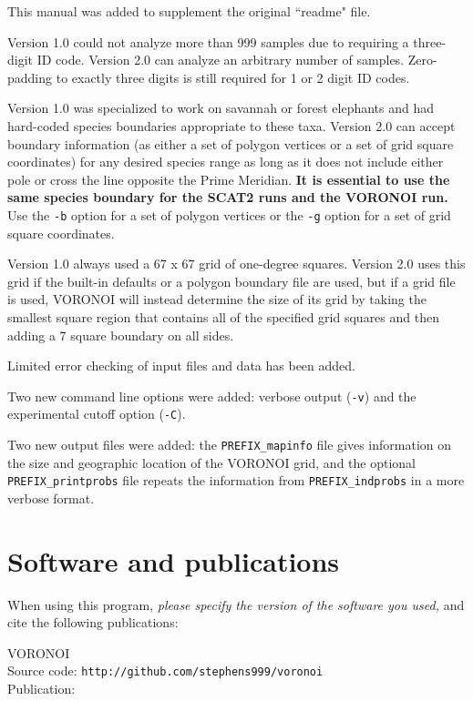 \documentclass[10pt,titlepage,times,letterpaper]{article}
\begin{document}
This manual was added to supplement the original ``readme" file.

Version 1.0 could not analyze more than 999 samples due to requiring a three-digit
ID code.  Version 2.0 can analyze an arbitrary number of samples.  Zero-padding 
to exactly three digits is still required for 1 or 2 digit ID codes.

Version 1.0 was specialized to work on savannah or forest elephants and had hard-coded
species boundaries appropriate to these taxa.  Version 2.0 can accept boundary information
(as either a set of polygon vertices or a set of grid square coordinates) for
any desired species range as long as it does not include either pole or cross the line
opposite the Prime Meridian.
{\bf It is essential to use the same species boundary for the SCAT2 runs and the VORONOI run.}
Use the {\tt -b} option for a set of polygon vertices or the {\tt -g} option for
a set of grid square coordinates.

Version 1.0 always used a 67 x 67 grid of one-degree squares.  Version 2.0 uses this
grid if the built-in defaults or a polygon boundary file are used, but if a grid file is used,
VORONOI will instead determine the size of its grid by taking the smallest square region 
that contains all of the specified grid squares and then adding a 7 square boundary on all sides.

Limited error checking of input files and data has been added.

Two new command line options were added:  verbose output ({\tt -v}) and the experimental cutoff 
option ({\tt -C}).

Two new output files were added:  the {\tt PREFIX\_mapinfo} file gives information on the
size and geographic location of the VORONOI grid, and the optional {\tt PREFIX\_printprobs}
file repeats the information from {\tt PREFIX\_indprobs} in a more verbose format.


\section{Software and publications}\label{software}

When using this program, {\it please specify the version of the software you used,} and
cite the following publications:

VORONOI \\
Source code: {\tt http://github.com/stephens999/voronoi} \\
Publication:
\end{document}
